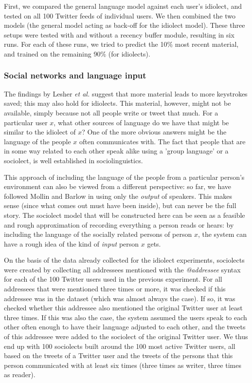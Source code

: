 \documentclass[12pt]{article}
\begin{document}
First, we compared the general language model against each user's idiolect, and tested on all 100 Twitter feeds of individual users. We then combined the two models (the general model acting as back-off for the idiolect model). These three setups were tested with and without a recency buffer module, resulting in six runs. For each of these runs, we tried to predict the 10\% most recent material, and trained on the remaining 90\% (for idiolects).

\subsubsection{Social networks and language input} \label{input_networks}

The findings by Lesher {\em et al.} \citeyear{Lesher+99} suggest that more material leads to more keystrokes saved; this may also hold for idiolects. This material, however, might not be available, simply because not all people write or tweet that much. For a particular user $x$, what other sources of language do we have that might be similar to the idiolect of $x$? One of the more obvious answers might be the language of the people $x$ often communicates with. The fact that people that are in some way related to each other speak alike using a 'group language' or a sociolect, is well established in sociolinguistics.

This approach of including the language of the people from a particular person's environment can also be viewed from a different perspective: so far, we have followed Mollin \citeyear{mollin09} and Barlow\citeyear{barlow10} in using only the \emph{output} of speakers. This makes sense (since what comes out must have been inside), but can never be the full story. The sociolect model that will be constructed here can be seen as a feasible and rough approximation of recording everything a person reads or hears: by including the language of the socially related persons of person $x$, the system can have a rough idea of the kind of \emph{input} person $x$ gets.

On the basis of the data already collected for the idiolect experiments, sociolects were created by collecting all addressees mentioned with the \emph{@addressee} syntax for each of the 100 Twitter users used in the previous experiment. For all addressees that were mentioned three times or more, it was checked if this addressee was in the dataset (which was almost always the case). If so, it was checked whether this addressee also mentioned the original Twitter user at least three times. If this was also the case, the system assumed the users speak to each other often enough to have their language adjusted to each other, and the tweets of this addressee were added to the sociolect of the original Twitter user. We thus end up with 100 sociolects built around the 100 most active Twitter users, all based on the tweets of a Twitter user and the tweets of the persons that this person communicated with at least six times (three times as writer, three times as reader).
\end{document}
